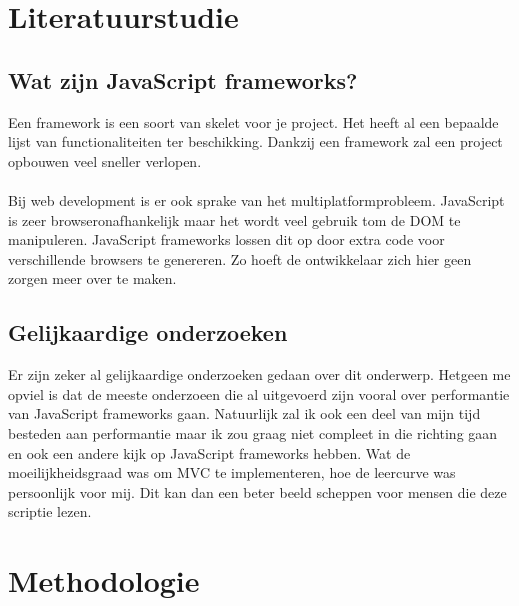\documentclass[fleqn,10pt]{voorstel}
\begin{document}

\section{Literatuurstudie}
\label{sec:literatuurstudie}

\subsection{Wat zijn JavaScript frameworks?}

Een framework is een soort van skelet voor je project. Het heeft al een bepaalde lijst van functionaliteiten ter beschikking. Dankzij een framework zal een project opbouwen veel sneller verlopen.\\
\\
Bij web development is er ook sprake van het multiplatformprobleem. JavaScript is zeer browseronafhankelijk maar het wordt veel gebruik tom de DOM te manipuleren. JavaScript frameworks lossen dit op door extra code voor verschillende browsers te genereren. Zo hoeft de ontwikkelaar zich hier geen zorgen meer over te maken. \autocite{javascriptframework}

\subsection{Gelijkaardige onderzoeken}

Er zijn zeker al gelijkaardige onderzoeken gedaan over dit onderwerp. Hetgeen me  opviel is dat de meeste onderzoeen die al uitgevoerd zijn vooral over performantie van JavaScript frameworks gaan. Natuurlijk zal ik ook een deel van mijn tijd besteden aan performantie maar ik zou graag niet compleet in die richting gaan en ook een andere kijk op JavaScript frameworks hebben. Wat de moeilijkheidsgraad was om MVC te implementeren, hoe de leercurve was persoonlijk voor mij. Dit kan dan een beter beeld scheppen voor mensen die deze scriptie lezen.


\section{Methodologie}
\label{sec:methodologie}
\end{document}
